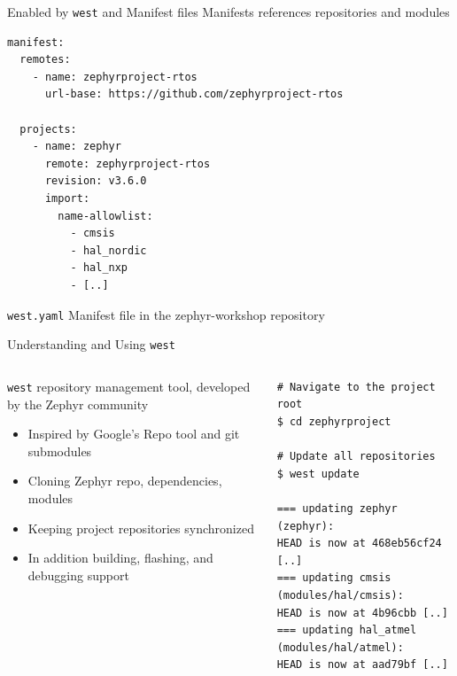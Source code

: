 \documentclass[10pt, aspectratio=169]{beamer}
\begin{document}
\begin{frame}[fragile]{Enabled by \texttt{west} and Manifest files}
  Manifests references repositories and modules \footnotemark[1]

  \begin{listing}[H]
    \begin{verbatim}
manifest:
  remotes:
    - name: zephyrproject-rtos
      url-base: https://github.com/zephyrproject-rtos

  projects:
    - name: zephyr
      remote: zephyrproject-rtos
      revision: v3.6.0
      import:
        name-allowlist:
          - cmsis
          - hal_nordic
          - hal_nxp
          - [..]
    \end{verbatim}
    \caption{\scriptsize{\texttt{west.yaml} Manifest file in the zephyr-workshop repository}}
  \end{listing}
\end{frame}
\begin{frame}[fragile]{Understanding and Using \texttt{west}}
  \begin{columns}
    \begin{column}{0.6\textwidth}
      \texttt{west} repository management tool, developed by the Zephyr community
      \begin{itemize}
        \item Inspired by Google's Repo tool and git submodules
        \item Cloning Zephyr repo, dependencies, modules
        \item Keeping project repositories synchronized
        \item In addition building, flashing, and debugging support
      \end{itemize}

    \end{column}
    \begin{column}{0.4\textwidth}
        {\fontsize{6}{6}\selectfont
  \begin{listing}[H]
    \begin{verbatim}
# Navigate to the project root
$ cd zephyrproject

# Update all repositories
$ west update

=== updating zephyr (zephyr):
HEAD is now at 468eb56cf24 [..]
=== updating cmsis (modules/hal/cmsis):
HEAD is now at 4b96cbb [..]
=== updating hal_atmel (modules/hal/atmel):
HEAD is now at aad79bf [..]
    \end{verbatim}
  \end{listing}
        }
    \end{column}
  \end{columns}
\end{frame}
\end{document}
